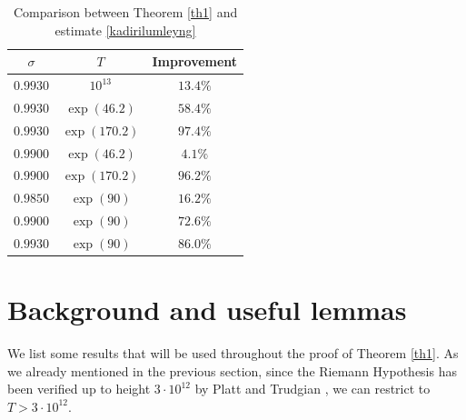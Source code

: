 \documentclass[reqno]{amsart}
\numberwithin{equation}{section}
\theoremstyle{remark}
\begin{document}
\begin{table}[h]
\def\arraystretch{1.3}
\centering
\caption{Comparison between Theorem \ref{th1} and estimate \eqref{kadirilumleyng} }
\begin{tabular}{|c|c|c|}
\hline
$\sigma$ & $T$  & Improvement \\
\hline
$0.9930$ &$10^{13}$  & $13.4\%$\\
\hline 
$0.9930$ &$\exp(46.2)$  & $58.4\%$\\
\hline 
$0.9930$ &$\exp(170.2)$  & $97.4\%$\\
\hline 
$0.9900$ &$\exp(46.2)$  & $4.1\%$\\
\hline 
$0.9900$ &$\exp(170.2)$  & $96.2\%$\\
\hline 
$0.9850$ &$\exp(90)$  & $16.2\%$\\
\hline 
$0.9900$ &$\exp(90)$  & $72.6\%$\\
\hline 
$0.9930$ &$\exp(90)$  & $86.0\%$\\
\hline 
\end{tabular}
\label{ex1}
\end{table}
\section{Background and useful lemmas}\label{background} We list some results that will be used throughout the proof of Theorem \ref{th1}. As we already mentioned in the previous section, since the Riemann Hypothesis has been verified up to height $3\cdot 10^{12}$ by Platt and Trudgian \cite{platt_riemann_2021}, we can restrict to $T> 3\cdot 10^{12}$.
\end{document}
